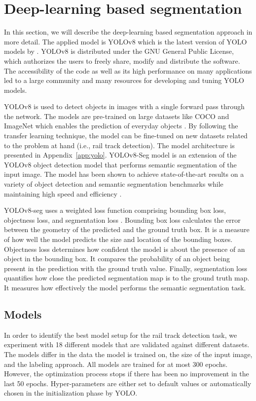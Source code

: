 \documentclass[Master,MDS,english]{BASE/twbook} %
\begin{document}
\section{Deep-learning based segmentation}

In this section, we will describe the deep-learning based segmentation approach in more detail. The applied model is YOLOv8 which is the latest version of YOLO models by \cite{Jocher_Ultralytics_YOLO_2023}.  YOLOv8 is distributed under the GNU General Public License, which authorizes the users to freely share, modify and distribute the software. The accessibility of the code as well as its high performance on many applications led to a large community and many resources for developing and tuning YOLO models. 

YOLOv8 is used to detect objects in images with a single forward pass through the network. The models are pre-trained on large datasets like COCO and ImageNet which enables the prediction of everyday objects \citep{Krishnakumar}. By following the transfer learning technique, the  model can be fine-tuned on new datasets related to the problem at hand (i.e., rail track detection).
The model architecture is presented in Appendix~\ref{app:yolo}.
YOLOv8-Seg model is an extension of the YOLOv8 object detection model that performs semantic segmentation of the input image. The  model has been shown to achieve state-of-the-art results on a variety of object detection and semantic segmentation benchmarks while maintaining high speed and efficiency \citep{Krishnakumar}. 

YOLOv8-seg uses a weighted loss function comprising bounding box loss, objectness loss, and segmentation loss \citep{loss_function}. Bounding box loss calculates the error between the geometry of the predicted and the ground truth box. It is a measure of how well the model predicts the size and location of the bounding boxes. Objectness loss determines how confident the model is about the presence of an object in the bounding box. It compares the probability of an object being present in the prediction with the ground truth value.
Finally, segmentation loss quantifies how close the predicted segmentation map is to the ground truth map. It measures how effectively the model performs the semantic segmentation task.


\subsection{Models}

In order to identify the best model setup for the rail track detection task, we experiment with 18 different models that are validated against different datasets. The models differ in the data the model is trained on, the size of the input image, and the labeling approach. All models are trained for at most 300 epochs. However, the optimization process stops if there has been no improvement in the last 50 epochs. 
Hyper-parameters are either set to default values or automatically chosen in the initialization phase by YOLO.
\end{document}
